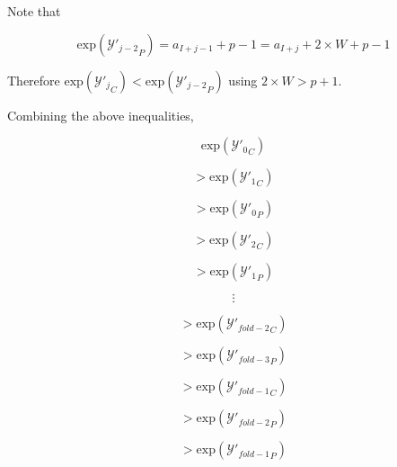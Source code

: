 \documentclass[12pt]{article}
\providecommand{\exp}{\ensuremath{\text{exp}}}
\theoremstyle{plain}
\begin{document}
    Note that

    \begin{equation*}
      \exp({\mathcal{Y}'_{j - 2}}_P) = a_{I + j - 1} + p - 1 = a_{I + j} + 2\times W + p - 1
    \end{equation*}

    Therefore $\exp({\mathcal{Y}'_j}_C) < \exp({\mathcal{Y}'_{j - 2}}_P)$ using $2 \times W > p + 1$.

    Combining the above inequalities,

    \begin{equation*}
    \exp({\mathcal{Y}'_0}_C)
    \end{equation*}

    \begin{equation*}
    > \exp({\mathcal{Y}'_1}_C)
    \end{equation*}

    \begin{equation*}
    > \exp({\mathcal{Y}'_0}_P)
    \end{equation*}

    \begin{equation*}
    > \exp({\mathcal{Y}'_2}_C)
    \end{equation*}

    \begin{equation*}
    > \exp({\mathcal{Y}'_1}_P)
    \end{equation*}

    \begin{equation*}
    \vdots
    \end{equation*}

    \begin{equation*}
    > \exp({\mathcal{Y}'_{fold - 2}}_C)
    \end{equation*}

    \begin{equation*}
    > \exp({\mathcal{Y}'_{fold - 3}}_P)
    \end{equation*}

    \begin{equation*}
    > \exp({\mathcal{Y}'_{fold - 1}}_C)
    \end{equation*}

    \begin{equation*}
    > \exp({\mathcal{Y}'_{fold - 2}}_P)
    \end{equation*}

    \begin{equation*}
    > \exp({\mathcal{Y}'_{fold - 1}}_P)
    \end{equation*}
\end{document}
